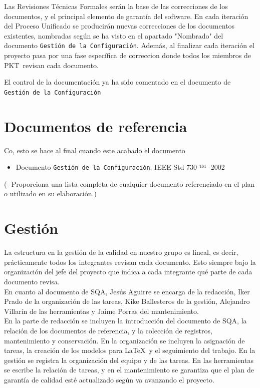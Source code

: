 \documentclass[spanish,a4paper,11pt, twoside]{report}	%
\newcommand*{\PKT}{\hbox{P}\kern-2.5pt\lower3.5pt\hbox{\small{K}}\kern-2.8pt\hbox{T}\kern-2pt}	%
\begin{document}
Las Revisiones Técnicas Formales serán la base de las correcciones de los documentos, y el principal elemento de garantía del software. En cada iteración del Proceso Unificado se producirán nuevas correcciones de los documentos existentes, nombradas según se ha visto en el apartado "Nombrado" del documento \texttt{Gestión de la Configuración}. Además, al finalizar cada iteración el proyecto pasa por una fase específica de correccion donde todos los miembros de  \PKT \ revisan cada documento.

El control de la documentación ya ha sido comentado en el documento de \texttt{Gestión de la Configuración}	

\newpage
\mbox{}
\thispagestyle{empty}						%
\newpage

\chapter{ Documentos de referencia}
	Co, esto se hace al final cuando este acabado el documento
\begin{itemize}
	\item Documento \texttt{Gestión de la Configuración}.
IEEE Std 730 ™ -2002
	
\end{itemize}	
	(- Proporciona una lista completa de cualquier documento referenciado en el plan o utilizado en su elaboración.)

\newpage
\mbox{}
\thispagestyle{empty}						%
\newpage

\chapter{ Gestión}%
	La estructura en la gestión de la calidad en nuestro grupo es lineal, es decir, prácticamente todos los integrantes revisan cada documento. Esto siempre bajo la organización del 
	jefe del proyecto que indica a cada integrante qué parte de cada documento revisa.\\

	 En cuanto al documento de SQA, Jesús Aguirre se encarga de la redacción, Iker Prado de la organización de las tareas, Kike Ballesteros de la 
	gestión, Alejandro Villarín de las herramientas y Jaime Porras del mantenimiento.\\

	En la parte de redacción se incluyen  la introducción del documento de SQA, la relación de los documentos de referencia, y la colección de registros, mantenimiento y conservación. En la organización se incluyen  la asignación de tareas, 
	la creación de los modelos para \LaTeX \ y el seguimiento del trabajo. En la gestión se registra la organización del equipo y de las tareas. En las herramientas se escribe la relación de tareas, y en el mantenimiento se garantiza
	que el plan de garantía de calidad esté actualizado según va avanzando el proyecto.\\
\end{document}
